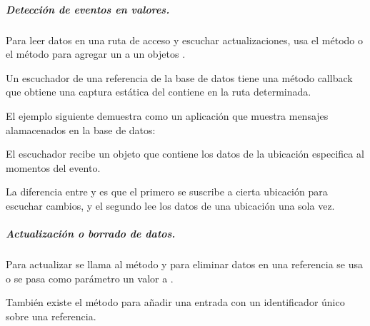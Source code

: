 \subparagraph{Detección de eventos en valores.}
\label{\detokenize{dev_docs:detecteccion-eventos-de-valores}}
Para leer datos en una ruta de acceso y escuchar actualizaciones, usa el
método  o el método 
para agregar un  a un objetos .

Un escuchador  de una referencia de la base de datos
tiene una método callback  que obtiene una captura estática
del contiene en la ruta determinada.

El ejemplo siguiente demuestra como un aplicación que muestra mensajes
alamacenados en la base de datos:

%
\begin{sphinxVerbatim}[commandchars=\\\{\}]
 
      
       
\end{sphinxVerbatim}

El escuchador recibe un objeto  que contiene los datos de la
ubicación especifica al momentos del evento.

La diferencia entre  y
 es que el primero se suscribe a cierta
ubicación para escuchar cambios, y el segundo lee los datos de una ubicación
una sola vez.


\subparagraph{Actualización o borrado de datos.}
\label{\detokenize{dev_docs:actulizacion-o-borrado-de-datos}}
Para actualizar se llama al método  y para eliminar datos
en una referencia se usa  o se pasa como parámetro un valor
 a .

También existe el método  para añadir una entrada con un identificador
único sobre una referencia.


